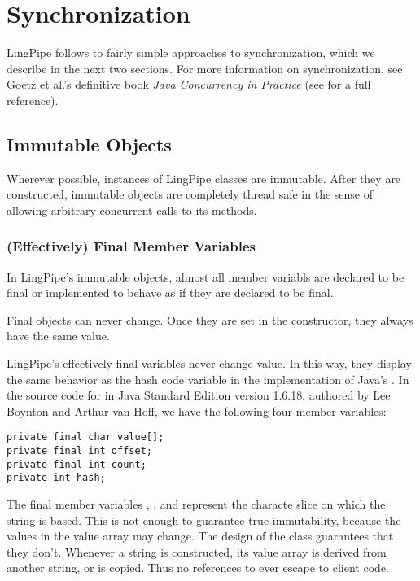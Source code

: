 \section{Synchronization}

LingPipe follows to fairly simple approaches to synchronization, which
we describe in the next two sections.  For more information on
synchronization, see Goetz et al.'s definitive book {\it Java
  Concurrency in Practice} (see  for a full
reference).

\subsection{Immutable Objects}

Wherever possible, instances of LingPipe classes are immutable.  After
they are constructed, immutable objects are completely thread safe in
the sense of allowing arbitrary concurrent calls to its methods.

\subsubsection{(Effectively) Final Member Variables}

In LingPipe's immutable objects, almost all member variabls are
declared to be final or implemented to behave as if they are declared
to be final.  

Final objects can never change.  Once they are set in the constructor,
they always have the same value.

LingPipe's effectively final variables never change value.  In this
way, they display the same behavior as the hash code variable in the
implementation of Java's .  In the source code for
 in Java Standard Edition version 1.6.18,
authored by Lee Boynton and Arthur van Hoff, we have the following
four member variables:
%
\begin{verbatim}
private final char value[];
private final int offset;
private final int count;
private int hash;
\end{verbatim}
%
The final member variables , , and
 represent the characte slice on which the string is
based.  This is not enough to guarantee true immutability, because the
values in the value array may change.  The design of the 
class guarantees that they don't.  Whenever a string is constructed,
its value array is derived from another string, or is copied.  Thus no
references to  ever escape to client code.

